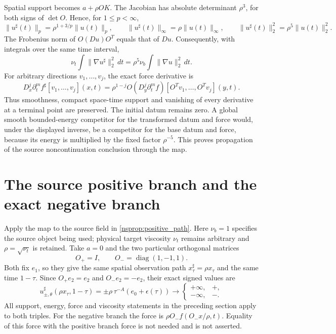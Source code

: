 \documentclass[11pt]{article}
\begin{document}
Spatial support becomes $a+\rho OK$. The Jacobian has absolute
determinant $\rho^3$, for both signs of $\det O$. Hence, for
$1\le p<\infty$,
\begin{equation}
 \|u^\sharp(t)\|_p=\rho^{1+3/p}\|u(t)\|_p,\qquad
 \|u^\sharp(t)\|_\infty=\rho\|u(t)\|_\infty,\qquad
 \|u^\sharp(t)\|_2^2=\rho^5\|u(t)\|_2^2 .
 \label{nsprop:norms}
\end{equation}
The Frobenius norm of $O(Du)O^T$ equals that of $Du$. Consequently,
with integrals over the same time interval,
\[
 \nu_t\int\|\nabla u^\sharp\|_2^2\,dt
     =\rho^5\nu_b\int\|\nabla u\|_2^2\,dt .
\]
For arbitrary directions $v_1,\ldots,v_j$, the exact force derivative is
\[
 D_x^j\partial_t^m f^\sharp[v_1,\ldots,v_j](x,t)
 =\rho^{1-j}O
   (D_y^j\partial_t^m f)[O^Tv_1,\ldots,O^Tv_j](y,t).
\]
Thus smoothness, compact space-time support and vanishing of every
derivative at a terminal point are preserved. The initial datum remains
zero. A global smooth bounded-energy competitor for the transformed
datum and force would, under the displayed inverse, be a competitor
for the base datum and force, because its energy is multiplied by the
fixed factor $\rho^{-5}$. This proves propagation of the source
noncontinuation conclusion through the map.

\section{The source positive branch and the exact negative branch}
\label{nsprop:branches}
Apply the map to the source field in \eqref{nsprop:positive_path}.
Here $\nu_b=1$ specifies the source object being used; physical target
viscosity $\nu_t$ remains arbitrary and $\rho=\sqrt{\nu_t}$ is retained.
Take $a=0$ and the two particular orthogonal matrices
\[
 O_+=I,\qquad O_-=\operatorname{diag}(1,-1,1).
\]
Both fix $e_1$, so they give the same spatial observation path
$x^\sharp_\tau=\rho x_\tau$ and the same time $1-\tau$.
Since $O_+e_2=e_2$ and $O_-e_2=-e_2$, their exact signed values are
\begin{equation}
 u^\sharp_{\pm,\theta}(\rho x_\tau,1-\tau)
     =\pm\rho\,\tau^{-A}(e_0+\epsilon(\tau))
        \longrightarrow\begin{cases}+\infty,&+,\\-\infty,&-.\end{cases}
 \label{nsprop:two_paths}
\end{equation}
All support, energy, force and viscosity statements in the preceding
section apply to both triples. For the negative branch the force is
$\rho O_-f(O_-x/\rho,t)$. Equality of this force with the positive
branch force is not needed and is not asserted.
\end{document}
